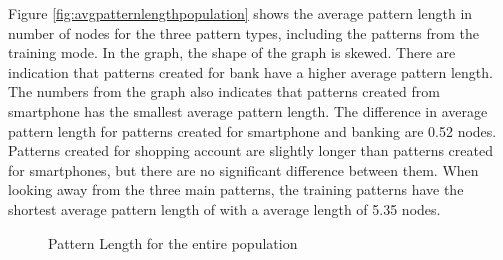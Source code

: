     Figure \ref{fig:avgpatternlengthpopulation} shows the average pattern length in number of nodes for the three pattern types, including the patterns from the training mode. In the graph, the shape of the graph is skewed. There are indication that patterns created for bank have a higher average pattern length. The numbers from the graph also indicates that patterns created from smartphone has the smallest average pattern length. The difference in average pattern length for patterns created for smartphone and banking are 0.52 nodes. Patterns created for shopping account are slightly longer than patterns created for smartphones, but there are no significant difference between them. When looking away from the three main patterns, the training patterns have the shortest average pattern length of with a average length of 5.35 nodes. 

    \begin{figure}[H]
      \centering
      \caption{Pattern Length for the entire population}
      \label{fig:patternlengthpopulation}
    \end{figure}

